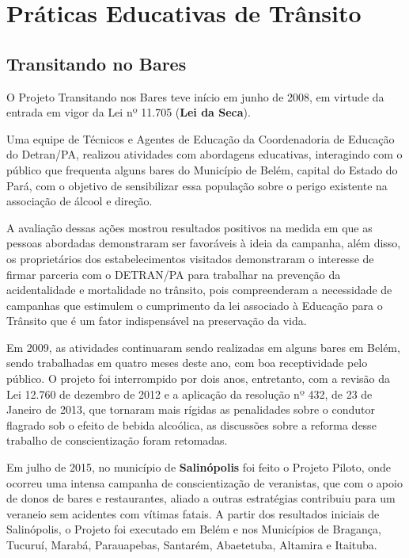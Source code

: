 \chapter{Práticas Educativas de Trânsito}
\section{Transitando no Bares}


O Projeto Transitando nos Bares teve início em junho de 2008, em virtude da entrada em vigor da Lei nº 11.705 (\textbf{Lei da Seca}).\vskip0.3cm

Uma equipe de Técnicos e Agentes de Educação da Coordenadoria de Educação do Detran/PA, realizou atividades com abordagens educativas, interagindo com o público que frequenta alguns bares do Município de Belém, capital do Estado do Pará, com o objetivo de sensibilizar essa população sobre o perigo existente na associação de álcool e direção. \vskip0.3cm

A avaliação dessas ações mostrou resultados positivos na medida em que as pessoas abordadas demonstraram ser favoráveis à ideia da campanha, além disso, os proprietários dos estabelecimentos visitados demonstraram o interesse de firmar parceria com o DETRAN/PA para trabalhar na prevenção da acidentalidade e mortalidade no trânsito, pois compreenderam a necessidade de campanhas que estimulem o cumprimento da lei associado à Educação para o Trânsito que é um fator indispensável na preservação da vida.\vskip0.3cm

Em 2009, as atividades continuaram sendo realizadas em alguns bares em Belém, sendo trabalhadas em quatro meses deste ano, com boa receptividade pelo público. O projeto foi interrompido por dois anos, entretanto, com a revisão da Lei 12.760 de dezembro de 2012 e a aplicação da resolução nº 432, de 23 de Janeiro de 2013, que tornaram mais rígidas as penalidades sobre o condutor flagrado sob o efeito de bebida alcoólica, as discussões sobre a reforma desse trabalho de conscientização foram retomadas.\vskip0.3cm

Em julho de 2015, no município de \textbf{Salinópolis} foi feito o Projeto Piloto, onde ocorreu uma intensa campanha de conscientização de veranistas, que com o apoio de donos de bares e restaurantes, aliado a outras estratégias contribuiu para um veraneio sem acidentes com vítimas fatais. A partir dos resultados iniciais de Salinópolis, o Projeto foi executado em Belém e nos Municípios de Bragança, Tucuruí, Marabá, Parauapebas, Santarém, Abaetetuba, Altamira e Itaituba.\vskip0.3cm


